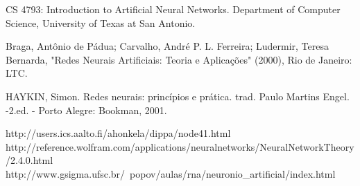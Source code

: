 \documentclass[12pt,journal,onecolumn]{IEEEtran}
\begin{document}

%
%
%
\begin{thebibliography}{1}

CS 4793: Introduction to Artificial Neural Networks. Department of Computer
Science, University of Texas at San Antonio.

Braga, Antônio de Pádua; Carvalho, André P. L.
Ferreira; Ludermir, Teresa Bernarda, "Redes Neurais Artificiais: Teoria e Aplicações" (2000), Rio de Janeiro: LTC.

HAYKIN, Simon. Redes neurais: princípios e prática. trad. Paulo Martins Engel. -2.ed. - Porto Alegre: Bookman, 2001.

http://users.ics.aalto.fi/ahonkela/dippa/node41.html
http://reference.wolfram.com/applications/neuralnetworks/NeuralNetworkTheory/2.4.0.html
http://www.gsigma.ufsc.br/~popov/aulas/rna/neuronio\_artificial/index.html

\end{thebibliography}


% 








\end{document}

